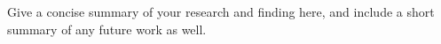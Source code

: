 
Give a concise summary of your research and finding here, and include a short summary of any future work as well.
